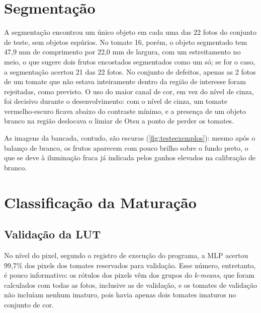 \section{Segmentação}

A segmentação encontrou um único objeto em cada uma das 22 fotos do conjunto de teste, sem objetos espúrios. No tomate 16, porém, o objeto segmentado tem 47,9 mm de comprimento por 22,0 mm de largura, com um estreitamento no meio, o que sugere dois frutos encostados segmentados como um só; se for o caso, a segmentação acertou 21 das 22 fotos. No conjunto de defeitos, apenas as 2 fotos de um tomate que não estava inteiramente dentro da região de interesse foram rejeitadas, como previsto. O uso do maior canal de cor, em vez do nível de cinza, foi decisivo durante o desenvolvimento: com o nível de cinza, um tomate vermelho-escuro ficava abaixo do contraste mínimo, e a presença de um objeto branco na região deslocava o limiar de Otsu a ponto de perder os tomates.

As imagens da bancada, contudo, são escuras (\autoref{fig:testeexemplos}): mesmo após o balanço de branco, os frutos aparecem com pouco brilho sobre o fundo preto, o que se deve à iluminação fraca já indicada pelos ganhos elevados na calibração de branco.

\section{Classificação da Maturação}

\subsection{Validação da LUT}

No nível do pixel, segundo o registro de execução do programa, a MLP acertou 99,7\% dos pixels dos tomates reservados para validação. Esse número, entretanto, é pouco informativo: os rótulos dos pixels vêm dos grupos do \textit{k-means}, que foram calculados com todas as fotos, inclusive as de validação, e os tomates de validação não incluíam nenhum imaturo, pois havia apenas dois tomates imaturos no conjunto de cor.

